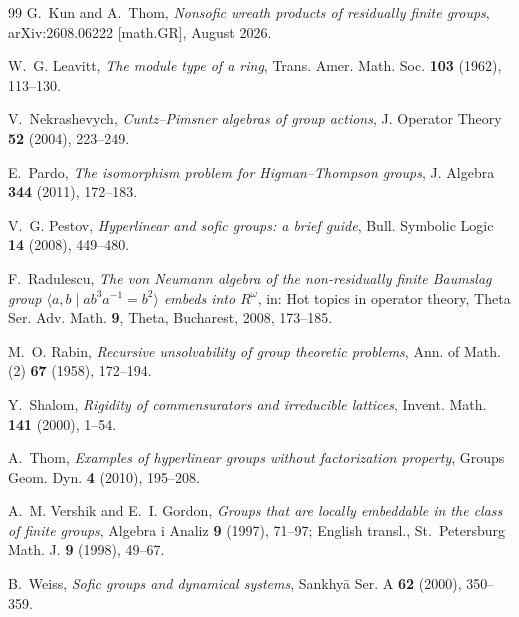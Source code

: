 \documentclass[11pt]{amsart}
\theoremstyle{definition}
\theoremstyle{plain}
\begin{document}
\begin{thebibliography}{99}
G.~Kun and A.~Thom,
\emph{Nonsofic wreath products of residually finite groups},
arXiv:2608.06222 [math.GR], August 2026.

W.~G. Leavitt,
\emph{The module type of a ring},
Trans. Amer. Math. Soc. \textbf{103} (1962), 113--130.

V.~Nekrashevych,
\emph{Cuntz--Pimsner algebras of group actions},
J. Operator Theory \textbf{52} (2004), 223--249.

E.~Pardo,
\emph{The isomorphism problem for Higman--Thompson groups},
J. Algebra \textbf{344} (2011), 172--183.

V.~G. Pestov,
\emph{Hyperlinear and sofic groups: a brief guide},
Bull. Symbolic Logic \textbf{14} (2008), 449--480.

F.~Radulescu,
\emph{The von Neumann algebra of the non-residually finite Baumslag group
\(\langle a,b\mid ab^3a^{-1}=b^2\rangle\) embeds into \(R^\omega\)},
in: Hot topics in operator theory, Theta Ser. Adv. Math. \textbf{9},
Theta, Bucharest, 2008, 173--185.

M.~O. Rabin,
\emph{Recursive unsolvability of group theoretic problems},
Ann. of Math. (2) \textbf{67} (1958), 172--194.

Y.~Shalom,
\emph{Rigidity of commensurators and irreducible lattices},
Invent. Math. \textbf{141} (2000), 1--54.

A.~Thom,
\emph{Examples of hyperlinear groups without factorization property},
Groups Geom. Dyn. \textbf{4} (2010), 195--208.

A.~M. Vershik and E.~I. Gordon,
\emph{Groups that are locally embeddable in the class of finite groups},
Algebra i Analiz \textbf{9} (1997), 71--97;
English transl., St.~Petersburg Math. J. \textbf{9} (1998), 49--67.

B.~Weiss,
\emph{Sofic groups and dynamical systems},
Sankhy\=a Ser. A \textbf{62} (2000), 350--359.

\end{thebibliography}
\end{document}
